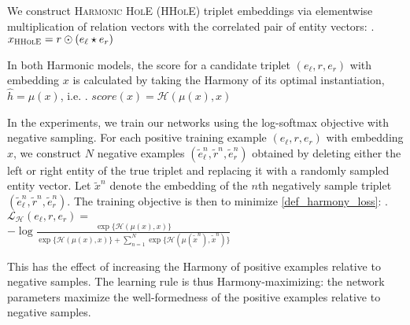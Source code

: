 \documentclass[a4paper,10pt]{article}
\begin{document}
We construct \textsc{Harmonic HolE} (\textsc{HHolE}) triplet embeddings via elementwise multiplication of relation vectors with the correlated pair of entity vectors:
\ex. $x_{\textsc{HHolE}} = r \odot (e_\ell \star e_r)$ \label{def_x_HHolE}


In both Harmonic models, the score for a candidate triplet $(e_\ell, r, e_r)$ with embedding $x$ is calculated by taking the Harmony of its optimal instantiation, $\hat{h} = \mu(x)$, i.e.
\ex. $score(x) = \mathcal{H}(\mu(x),x)$

In the experiments, we train our networks using the log-softmax objective with negative sampling. For each positive training example $(e_\ell, r, e_r)$ with embedding $x$, we construct $N$ negative examples $(\tilde{e}^n_{\ell}, \tilde{r}^n, \tilde{e}^n_r)$ obtained by deleting either the left or right entity of the true triplet and replacing it with a randomly sampled entity vector. Let $\tilde{x}^n$ denote the embedding of the $n$th negatively sample triplet $(\tilde{e}^n_{\ell}, \tilde{r}^n, \tilde{e}^n_r)$. The training objective is then to minimize \ref{def_harmony_loss}:
\ex. {\small $\mathcal{L}_{\mathcal{H}}(e_\ell, r, e_r) = $\\
	\phantom{h}\hfill $-\log \frac{\exp \{ \mathcal{H}(\mu(x),x)\}}{\exp \{ \mathcal{H}(\mu(x),x)\} + \sum_{n=1}^N \exp \{ \mathcal{H}(\mu(\tilde{x}^n), \tilde{x}^n) \}}$ }\label{def_harmony_loss}

This has the effect of increasing the Harmony of positive examples relative to negative samples. The learning rule is thus Harmony-maximizing: the network parameters maximize the well-formedness of the positive examples relative to negative samples. 
\end{document}
